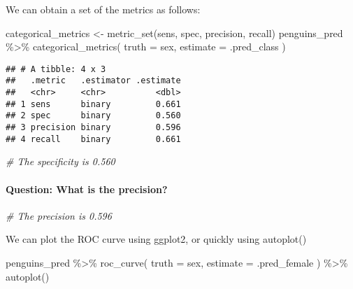 \documentclass[
]{article}
\newenvironment{Shaded}{\begin{snugshade}}{\end{snugshade}}
\newcommand{\AttributeTok}[1]{\textcolor[rgb]{0.77,0.63,0.00}{#1}}
\newcommand{\CommentTok}[1]{\textcolor[rgb]{0.56,0.35,0.01}{\textit{#1}}}
\newcommand{\FunctionTok}[1]{\textcolor[rgb]{0.00,0.00,0.00}{#1}}
\newcommand{\NormalTok}[1]{#1}
\newcommand{\OtherTok}[1]{\textcolor[rgb]{0.56,0.35,0.01}{#1}}
\newcommand{\SpecialCharTok}[1]{\textcolor[rgb]{0.00,0.00,0.00}{#1}}
\begin{document}
We can obtain a set of the metrics as follows:

\begin{Shaded}
\begin{Highlighting}[]
\NormalTok{categorical\_metrics }\OtherTok{\textless{}{-}} \FunctionTok{metric\_set}\NormalTok{(sens, spec, precision, recall) }
\NormalTok{penguins\_pred }\SpecialCharTok{\%\textgreater{}\%} 
  \FunctionTok{categorical\_metrics}\NormalTok{( }\AttributeTok{truth =}\NormalTok{ sex, }\AttributeTok{estimate =}\NormalTok{ .pred\_class )}
\end{Highlighting}
\end{Shaded}

\begin{verbatim}
## # A tibble: 4 x 3
##   .metric   .estimator .estimate
##   <chr>     <chr>          <dbl>
## 1 sens      binary         0.661
## 2 spec      binary         0.560
## 3 precision binary         0.596
## 4 recall    binary         0.661
\end{verbatim}

\begin{Shaded}
\begin{Highlighting}[]
\CommentTok{\# The specificity is 0.560}
\end{Highlighting}
\end{Shaded}

\hypertarget{question-what-is-the-precision}{%
\paragraph{Question: What is the
precision?}\label{question-what-is-the-precision}}

\begin{Shaded}
\begin{Highlighting}[]
\CommentTok{\# The precision is 0.596}
\end{Highlighting}
\end{Shaded}

We can plot the ROC curve using ggplot2, or quickly using autoplot()

\begin{Shaded}
\begin{Highlighting}[]
\NormalTok{penguins\_pred }\SpecialCharTok{\%\textgreater{}\%} 
  \FunctionTok{roc\_curve}\NormalTok{( }\AttributeTok{truth =}\NormalTok{ sex, }\AttributeTok{estimate =}\NormalTok{ .pred\_female ) }\SpecialCharTok{\%\textgreater{}\%} 
  \FunctionTok{autoplot}\NormalTok{()}
\end{Highlighting}
\end{Shaded}
\end{document}
